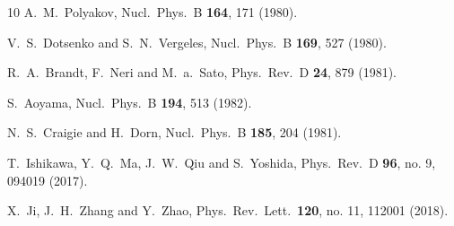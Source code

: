 \begin{thebibliography}{10}
  A.~M.~Polyakov,
  Nucl.\ Phys.\ B {\bf 164}, 171 (1980).


  V.~S.~Dotsenko and S.~N.~Vergeles,
  Nucl.\ Phys.\ B {\bf 169}, 527 (1980).


  R.~A.~Brandt, F.~Neri and M.~a.~Sato,
  Phys.\ Rev.\ D {\bf 24}, 879 (1981).


  S.~Aoyama,
  Nucl.\ Phys.\ B {\bf 194}, 513 (1982).


  N.~S.~Craigie and H.~Dorn,
  Nucl.\ Phys.\ B {\bf 185}, 204 (1981).


  T.~Ishikawa, Y.~Q.~Ma, J.~W.~Qiu and S.~Yoshida,
  Phys.\ Rev.\ D {\bf 96}, no. 9, 094019 (2017).


  X.~Ji, J.~H.~Zhang and Y.~Zhao,
  Phys.\ Rev.\ Lett.\  {\bf 120}, no. 11, 112001 (2018).



\end{thebibliography}
